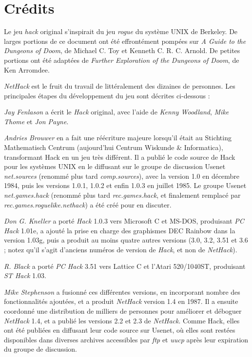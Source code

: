 \documentclass[titlepage]{article}
\begin{document}
\section{Crédits}
Le jeu %
\textit{hack} original s'inspirait du jeu \textit{rogue} du système
UNIX
de Berkeley.  De larges portions de ce document ont été effrontément
pompées sur %
\textit{A Guide to the Dungeons of Doom}, de Michael C. Toy
et Kenneth C. R. C. Arnold.  De petites portions ont été adaptées de
\textit{Further Exploration of the Dungeons of Doom}, de Ken Arromdee.

\textit{NetHack} est le fruit du travail de littéralement des dizaines de personnes.
Les principales étapes du développement du jeu sont décrites ci-dessous :

\bigskip
\noindent \textit{Jay Fenlason} a écrit le \textit{Hack} original, avec l'aide de {\it
Kenny Woodland}, \textit{Mike Thome} et \textit{Jon Payne}.

\medskip
\noindent \textit{Andries Brouwer} en a fait une réécriture majeure lorsqu'il était au
Stichting Mathematisch Centrum (aujourd'hui Centrum Wiskunde \& Informatica),
transformant Hack en un jeu très différent.
Il a publié le code source de Hack pour les systèmes UNIX
en le diffusant sur le groupe de discussion Usenet
\textit{net.sources} (renommé plus tard \textit{comp.sources}),
avec la version 1.0 en décembre 1984, puis les versions 1.0.1, 1.0.2
et enfin 1.0.3 en juillet 1985.
Le groupe Usenet \textit{net.games.hack} (renommé
plus tard \textit{rec.games.hack}, et finalement remplacé
par \textit{rec.games.roguelike.nethack})
a été créé pour en discuter.

\medskip
\noindent \textit{Don G. Kneller} a porté \textit{Hack} 1.0.3 vers Microsoft C et MS-DOS,
produisant \textit{PC Hack} 1.01e, a ajouté la prise en charge des graphismes DEC Rainbow dans
la version 1.03g, puis a produit au moins quatre autres versions (3.0, 3.2,
3.51 et 3.6 ;
notez qu'il s'agit d'anciens numéros de version de \textit{Hack}, et non de
\textit{NetHack}).

\medskip
\noindent \textit{R. Black} a porté \textit{PC Hack} 3.51 vers Lattice C et l'Atari
520/1040ST, produisant \textit{ST Hack} 1.03.

\medskip
\noindent \textit{Mike Stephenson} a fusionné ces différentes versions,
en incorporant nombre des fonctionnalités ajoutées, et a produit \textit{NetHack} version
1.4 en 1987.
Il a ensuite coordonné une distribution de milliers de personnes pour améliorer et
déboguer \textit{NetHack} 1.4, et a publié les versions 2.2 et 2.3 de \textit{NetHack}.
Comme Hack, elles ont été publiées en diffusant leur code source sur Usenet, où
elles sont restées disponibles dans diverses archives accessibles
par \textit{ftp} et \textit{uucp} après leur expiration du groupe de discussion.
\end{document}
